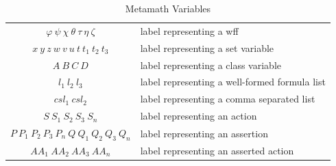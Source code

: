 \begin{table}[htp]
\caption{Metamath Variables}
\begin{center}
\begin{tabular}{|c l|}
\hline
{\color{wffcolor}$\varphi~\psi~\chi~\theta~\tau~\eta~\zeta$} & label representing a wff \\
{\color{variablecolor}$x~y~z~w~v~u~t~t_1~t_2~t_3$} & label representing a set variable \\
{\color{classcolor}$A~B~C~D$} & label representing a class variable \\
{\color{wffcolor}$l_1~l_2~l_3$} & label representing a well-formed formula list \\
{\color{classcolor}$csl_1~csl_2$} & label representing a comma separated list \\
{\color{actioncolor}$S~S_1~S_2~S_3~S_n$} & label representing an action \\
{\color{assertioncolor}$P~P_1~P_2~P_3~P_n~Q~Q_1~Q_2~Q_3~Q_n$} & label representing an assertion \\
{\color{formulacolor}$AA_1~AA_2~AA_3~AA_n$} & label representing an asserted action \\
\hline
\end{tabular}
\end{center}
\label{tab:var}
\end{table}%

